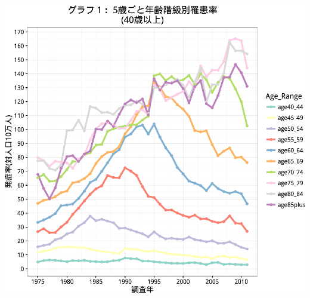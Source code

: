 \documentclass[11pt,]{article}
\begin{document}
\includegraphics{example_files/figure-latex/unnamed-chunk-4-1.pdf}
\end{document}
